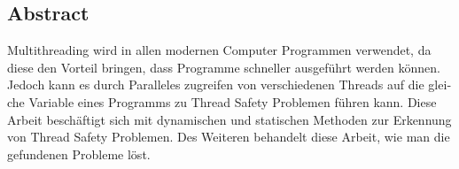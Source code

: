 \begin{otherlanguage}{ngerman}
	\chapter*{Abstract}
	Multithreading wird in allen modernen Computer Programmen verwendet, da diese den Vorteil bringen, dass Programme  schneller ausgeführt werden können. Jedoch kann es durch Paralleles zugreifen von verschiedenen  Threads auf die gleiche Variable eines Programms zu Thread Safety Problemen führen kann. Diese Arbeit beschäftigt sich mit dynamischen und statischen Methoden zur Erkennung von Thread Safety Problemen. Des Weiteren behandelt diese Arbeit, wie man die gefundenen Probleme löst.
\end{otherlanguage}
